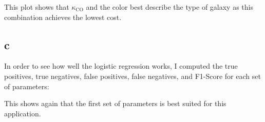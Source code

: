 This plot shows that $\kappa_{\text{CO}}$ and the color best describe the type of galaxy as this combination achieves the lowest cost.




\subsection*{c}
In order to see how well the logistic regression works, I computed the true positives, true negatives, false positives, false negatives, and F1-Score for each set of parameters:


This shows again that the first set of parameters is best suited for this application.



